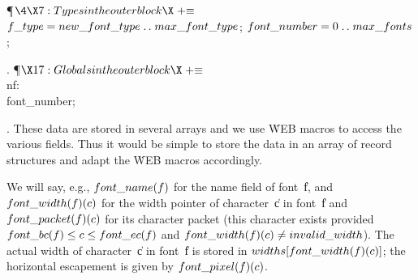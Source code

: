 \Y\P$\4\X7:Types in the outer block\X\mathrel{+}\S$\6
$\\{f\_type}=\\{new\_font\_type}\to\\{max\_font\_type}$;\6
$\\{font\_number}=0\to\\{max\_fonts}$;\par
\fi

. \P$\X17:Globals in the outer block\X\mathrel{+}\S$\6
\4\\{nf}: \\{font\_number};\par
\fi

. These data are stored in several arrays and we use \.{WEB} macros
to access the various fields. Thus it would be simple to store the
data in an array of record structures and adapt the \.{WEB} macros
accordingly.

We will say, e.g., $\\{font\_name}(\|f)$ for the name field of font~\|f, and
$\\{font\_width}(\|f)(\|c)$ for the width pointer of character~\|c in font~\|f
and $\\{font\_packet}(\|f)(\|c)$ for its character packet (this character
exists provided $\\{font\_bc}(\|f)\L\|c\L\\{font\_ec}(\|f)$ and
$\\{font\_width}(\|f)(\|c)\I\\{invalid\_width}$). The actual width of
character~\|c in
font~\|f is stored in $\\{widths}[\\{font\_width}(\|f)(\|c)]$; the horizontal
escapement is given by $\\{font\_pixel}(\|f)(\|c)$.

